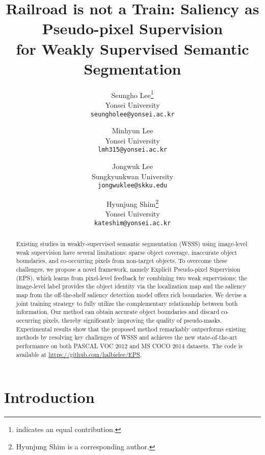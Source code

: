 \documentclass[final]{cvpr}
\begin{document}
\title{Railroad is not a Train: Saliency as Pseudo-pixel Supervision \\ for Weakly Supervised Semantic Segmentation}

\author{Seungho Lee\thanks{ indicates an equal contribution.}\\
Yonsei University\\
{\tt\small seungholee@yonsei.ac.kr}
\and
Minhyun Lee\footnotemark[1]\\
Yonsei University\\
{\tt\small lmh315@yonsei.ac.kr}
\and 
Jongwuk Lee\\
Sungkyunkwan University\\
{\tt\small jongwuklee@skku.edu}
\and 
Hyunjung Shim\thanks{Hyunjung Shim is a corresponding author.}\\
Yonsei University\\
{\tt\small kateshim@yonsei.ac.kr}
}

\maketitle
\thispagestyle{empty}
\pagestyle{empty}



\begin{abstract}
Existing studies in weakly-supervised semantic segmentation (WSSS) using image-level weak supervision have several limitations: sparse object coverage, inaccurate object boundaries, and co-occurring pixels from non-target objects. To overcome these challenges, we propose a novel framework, namely Explicit Pseudo-pixel Supervision (EPS), which learns from pixel-level feedback by combining two weak supervisions; the image-level label provides the object identity via the localization map and the saliency map from the off-the-shelf saliency detection model offers rich boundaries. We devise a joint training strategy to fully utilize the complementary relationship between both information. Our method can obtain accurate object boundaries and discard co-occurring pixels, thereby significantly improving the quality of pseudo-masks. Experimental results show that the proposed method remarkably outperforms existing methods by resolving key challenges of WSSS and achieves the new state-of-the-art performance on both PASCAL VOC 2012 and MS COCO 2014 datasets. The code is available at \href{https://github.com/halbielee/EPS}{https://github.com/halbielee/EPS}.
\end{abstract}


\section{Introduction}
\end{document}
